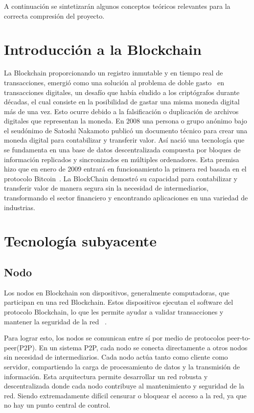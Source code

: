 
A continuación se sintetizarán algunos conceptos teóricos relevantes para la correcta compresión del proyecto.

\section{Introducción a la Blockchain}

La Blockchain proporcionando un registro inmutable y en tiempo real de transacciones, emergió como una solución al problema de doble gasto~\cite{dobleGasto} en transacciones digitales, un desafío que había eludido a los criptógrafos durante décadas, el cual consiste en la posibilidad de gastar una misma moneda digital más de una vez. Esto ocurre debido a la falsificación o duplicación de archivos digitales que representan la moneda.
En 2008 una persona o grupo anónimo bajo el seudónimo de Satoshi Nakamoto publicó un documento técnico para crear una moneda digital para contabilizar y transferir valor. Así nació una tecnología que se fundamenta en una base de datos descentralizada compuesta por bloques de información replicados y sincronizados en múltiples ordenadores.  
Esta premisa hizo que en enero de 2009 entrará en funcionamiento la primera red basada en el protocolo Bitcoin~\cite{introducciónBitcoin}.
La BlockChain demostró su capacidad para contabilizar y transferir valor de manera segura sin la necesidad de intermediarios, transformando el sector financiero y encontrando aplicaciones en una variedad de industrias.



\section{Tecnología subyacente}


\subsection{Nodo}

Los nodos en Blockchain son dispositivos, generalmente computadoras, que participan en una red Blockchain. Estos dispositivos ejecutan el software del protocolo Blockchain, lo que les permite ayudar a validar transacciones y mantener la seguridad de la red ~\cite{IntroducciónNodo}.

Para lograr esto, los nodos se comunican entre sí por medio de protocolos peer-to-peer(P2P). En un sistema P2P, cada nodo se conecta directamente a otros nodos sin necesidad de intermediarios. Cada nodo actúa tanto como cliente como servidor, compartiendo la carga de procesamiento de datos y la transmisión de información.
Esta arquitectura permite desarrollar un red robusta y descentralizada donde cada nodo contribuye al mantenimiento y seguridad de la red. Siendo extremadamente difícil censurar o bloquear el acceso a la red, ya que no hay un punto central de control.

